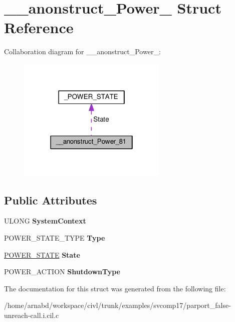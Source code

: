 \hypertarget{struct____anonstruct__Power__81}{}\section{\+\_\+\+\_\+anonstruct\+\_\+\+Power\+\_ Struct Reference}
\label{struct____anonstruct__Power__81}


Collaboration diagram for \+\_\+\+\_\+anonstruct\+\_\+\+Power\+\_\+:
\nopagebreak
\begin{figure}[H]
\begin{center}
\leavevmode
\includegraphics[width=202pt]{struct____anonstruct__Power__81__coll__graph}
\end{center}
\end{figure}
\subsection*{Public Attributes}
\begin{DoxyCompactItemize}
\item 
\hypertarget{struct____anonstruct__Power__81_aee38f500ebb32d5d5c12e377ba91509e}{}U\+L\+O\+N\+G {\bfseries System\+Context}\label{struct____anonstruct__Power__81_aee38f500ebb32d5d5c12e377ba91509e}

\item 
\hypertarget{struct____anonstruct__Power__81_a0c8355acc950065e93dab5179605ca2d}{}P\+O\+W\+E\+R\+\_\+\+S\+T\+A\+T\+E\+\_\+\+T\+Y\+P\+E {\bfseries Type}\label{struct____anonstruct__Power__81_a0c8355acc950065e93dab5179605ca2d}

\item 
\hypertarget{struct____anonstruct__Power__81_a23fe49f4e77445b79e7b1776804b5080}{}\hyperlink{union__POWER__STATE}{P\+O\+W\+E\+R\+\_\+\+S\+T\+A\+T\+E} {\bfseries State}\label{struct____anonstruct__Power__81_a23fe49f4e77445b79e7b1776804b5080}

\item 
\hypertarget{struct____anonstruct__Power__81_aead16704a1edb3054d26f1e101bd7fdc}{}P\+O\+W\+E\+R\+\_\+\+A\+C\+T\+I\+O\+N {\bfseries Shutdown\+Type}\label{struct____anonstruct__Power__81_aead16704a1edb3054d26f1e101bd7fdc}

\end{DoxyCompactItemize}


The documentation for this struct was generated from the following file\+:\begin{DoxyCompactItemize}
\item 
/home/arnabd/workspace/civl/trunk/examples/svcomp17/parport\+\_\+false-\/unreach-\/call.\+i.\+cil.\+c\end{DoxyCompactItemize}
